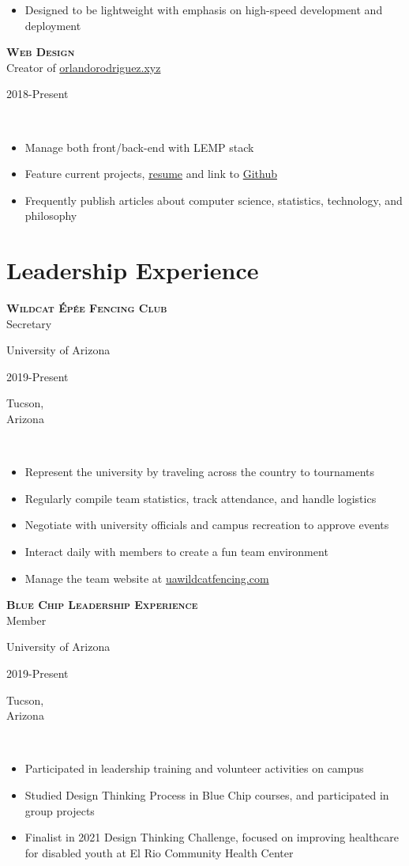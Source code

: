 \documentclass[letterpaper,10pt]{article}
\newcommand{\ua}{University of Arizona}
\newcommand{\town}{Tucson,\\ Arizona}
\newcommand{\site}{\href{https://www.orlandorodriguez.xyz}{orlandorodriguez.xyz}}
\newcommand{\wcfsite}{\href{https://www.uawildcatfencing.com}{uawildcatfencing.com}}
\newcommand{\entry}[5]{

    \hfill\vline\hfill
    \begin{minipage}[t]{.80\textwidth}
    
        \textbf{\textsc{#3}}\\
        #4
        
        \footnotesize{#1}
    \end{minipage}
    \hfill\vline\hfill
    \begin{minipage}[t]{.15\textwidth}
        #2
        
        \footnotesize{#5}
    \end{minipage}\\\vspace{.1cm}
}
\begin{document}
\begin{textblock}{10}
\begin{itemize}
    			\item Designed to be lightweight with emphasis on high-speed development and deployment
		\end{itemize}
		\vspace{\baselineskip}
		\entry{}{2018-Present}{Web Design}{Creator of {\site}}{}
		\begin{itemize}
		    	\item Manage both front/back-end with LEMP stack
		    	\item Feature current projects, \href{https://www.resume.orlandorodriguez.xyz}{resume} and link to \href{https://www.github.com/OrlieRod314}{Github}
		    	\item Frequently publish articles about computer science, statistics, technology, and philosophy
		\end{itemize}
		\vspace{\baselineskip}
		\section{Leadership Experience}
		\vspace{1em}
		\entry{\ua}{2019-Present}{Wildcat Épée Fencing Club}{Secretary}{\town}
		\begin{itemize}
   			\item Represent the university by traveling across the country to tournaments 
   			\item Regularly compile team statistics, track attendance, and handle logistics
   			\item Negotiate with university officials and campus recreation to approve events
    			\item Interact daily with members to create a fun team environment 
			\item Manage the team website at \wcfsite
		\end{itemize}
		\vspace{\baselineskip}
		\entry{\ua}{2019-Present}{Blue Chip Leadership Experience}{Member}{\town}
		\begin{itemize}
			\item Participated in leadership training and volunteer activities on campus
			\item Studied Design Thinking Process in Blue Chip courses, and participated in group projects
			\item Finalist in 2021 Design Thinking Challenge, focused on improving healthcare for disabled youth at El Rio Community Health Center
		\end{itemize}
	\end{textblock}	
\end{document}
